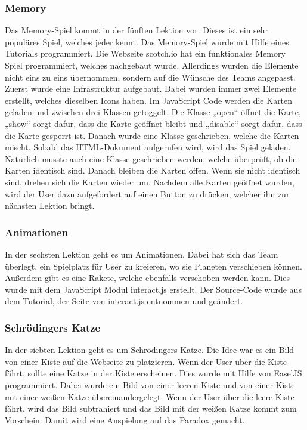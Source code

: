 \subsubsection{Memory}
Das Memory-Spiel kommt in der fünften Lektion vor. Dieses ist ein sehr populäres Spiel, welches jeder kennt. Das Memory-Spiel wurde mit Hilfe eines Tutorials programmiert. Die Webseite scotch.io  hat ein funktionales Memory Spiel programmiert, welches nachgebaut wurde. Allerdings wurden die Elemente nicht eins zu eins übernommen, sondern auf die Wünsche des Teams angepasst. Zuerst wurde eine Infrastruktur aufgebaut. Dabei wurden immer zwei Elemente erstellt, welches dieselben Icons haben. Im JavaScript Code werden die Karten geladen und zwischen drei Klassen getoggelt. Die Klasse „open“ öffnet die Karte, „show“ sorgt dafür, dass die Karte geöffnet bleibt und „disable“ sorgt dafür, dass die Karte gesperrt ist. Danach wurde eine Klasse geschrieben, welche die Karten mischt. Sobald das HTML-Dokument aufgerufen wird, wird das Spiel geladen. Natürlich musste auch eine Klasse geschrieben werden, welche überprüft, ob die Karten identisch sind. Danach bleiben die Karten offen. Wenn sie nicht identisch sind, drehen sich die Karten wieder um. Nachdem alle Karten geöffnet wurden, wird der User dazu aufgefordert auf einen Button zu drücken, welcher ihn zur nächsten Lektion bringt. 

\subsubsection{Animationen}
In der sechsten Lektion geht es um Animationen. Dabei hat sich das Team überlegt, ein Spielplatz für User zu kreieren, wo sie Planeten verschieben können. Außerdem gibt es eine Rakete, welche ebenfalls verschoben werden kann. Dies wurde mit dem JavaScript Modul interact.js erstellt. Der Source-Code wurde aus dem Tutorial, der Seite von interact.js entnommen und geändert. 

\subsubsection{Schrödingers Katze}
In der siebten Lektion geht es um Schrödingers Katze. Die Idee war es ein Bild von einer Kiste auf die Webseite zu platzieren. Wenn der User über die Kiste fährt, sollte eine Katze in der Kiste erscheinen. Dies wurde mit Hilfe von EaselJS programmiert. Dabei wurde ein Bild von einer leeren Kiste und von einer Kiste mit einer weißen Katze übereinandergelegt. Wenn der User über die leere Kiste fährt, wird das Bild subtrahiert und das Bild mit der weißen Katze kommt zum Vorschein. Damit wird eine Anspielung auf das Paradox gemacht. 
